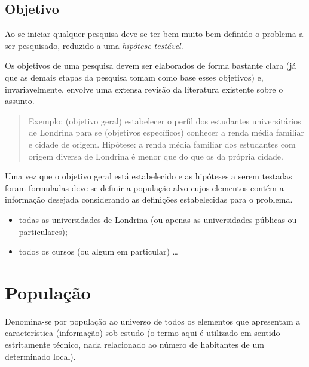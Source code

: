 \documentclass[
]{book}
\providecommand{\tightlist}{%
  \setlength{\itemsep}{0pt}\setlength{\parskip}{0pt}}
\begin{document}
\hypertarget{objetivo}{%
\subsection{Objetivo}\label{objetivo}}

Ao se iniciar qualquer pesquisa deve-se ter bem muito bem definido o problema a ser pesquisado, reduzido a uma \emph{hipótese testável}.

\hfill\break

Os objetivos de uma pesquisa devem ser elaborados de forma bastante clara (já que as demais etapas da pesquisa tomam como base esses objetivos) e, invariavelmente, envolve uma extensa revisão da literatura existente sobre o assunto.

\hfill\break

\begin{quote}
Exemplo: (objetivo geral) estabelecer o perfil dos estudantes universitários de Londrina para se (objetivos específicos) conhecer a renda média familiar e cidade de origem. Hipótese: a renda média familiar dos estudantes com origem diversa de Londrina é menor que do que os da própria cidade.
\end{quote}

\hfill\break

Uma vez que o objetivo geral está estabelecido e as hipóteses a serem testadas foram formuladas deve-se definir a população alvo cujos elementos contém a informação desejada considerando as definições estabelecidas para o problema.

\hfill\break

\begin{itemize}
\tightlist
\item
  todas as universidades de Londrina (ou apenas as universidades públicas ou particulares);
\item
  todos os cursos (ou algum em particular) \ldots{}
\end{itemize}

\hypertarget{populauxe7uxe3o}{%
\section{População}\label{populauxe7uxe3o}}

\hfill\break

Denomina-se por população ao universo de todos os elementos que apresentam a característica (informação) sob estudo (o termo aqui é utilizado em sentido estritamente técnico, nada relacionado ao número de habitantes de um determinado local).
\end{document}
